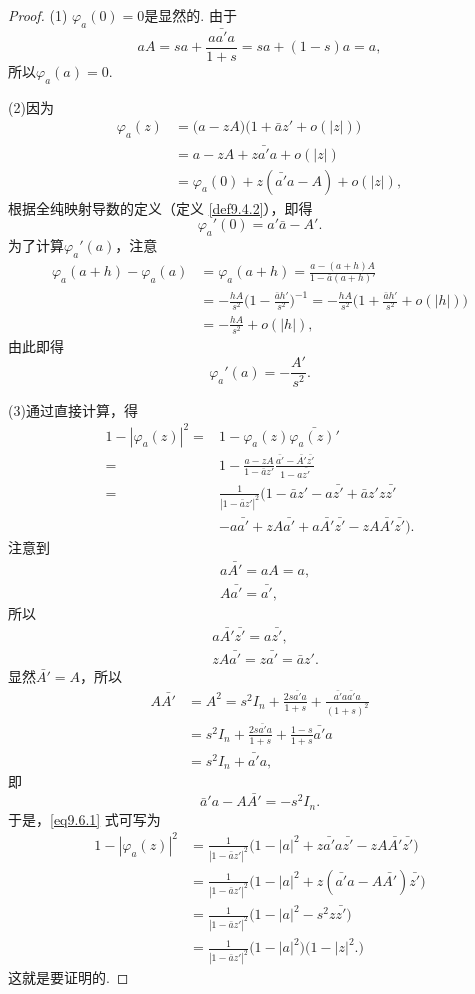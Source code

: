 \begin{proof}
(1) $\varphi_a(0)=0$是显然的. 由于
\[aA=sa+\frac{a\bar {a'}a}{1+s}=sa+(1-s)a=a,\]
所以$\varphi_a(a)=0$.

(2)因为
\begin{align*}
\varphi_a(z)&=\big(a-zA)(1+\bar az'+o(|z|)\big)\\
&=a-zA+z\bar {a'}a+o(|z|)\\
&=\varphi_a(0)+z(\bar {a'}a-A)+o(|z|),
\end{align*}
根据全纯映射导数的定义（定义 \ref{def9.4.2}），即得
\[\varphi_a'(0)=a'\bar a-A'.\]
为了计算$\varphi_a'(a)$，注意
\begin{align*}
\varphi_a(a+h)-\varphi_a(a)&=\varphi_a(a+h)=\frac{a-(a+h)A}{1-\bar a(a+h)'}\\
&=-\frac{hA}{s^2}\bigg(1-\frac{\bar ah'}{s^2}\bigg)^{-1}=
-\frac{hA}{s^2}\bigg(1+\frac{\bar ah'}{s^2}+o(|h|)\bigg)\\
&=-\frac{hA}{s^2}+o(|h|),
\end{align*}
由此即得
\[\varphi_a'(a)=-\frac{A'}{s^2}.\]

(3)通过直接计算，得
\begin{equation}\label{eq9.6.1}
\begin{aligned}
1-|\varphi_a(z)|^2={}&1-\varphi_a(z)\bar{\varphi_a(z)'}\\
={}&1-\frac{a-zA}{1-\bar az'}\frac{\bar{a'}-\bar{A'}\bar{z'}}{1-a\bar{z'}}\\
={}&\frac1{|1-\bar az'|^2}(1-\bar az'-a\bar{z'}+\bar az'z\bar{z'}\\
&-a\bar{a'}+zA\bar{a'}+a\bar{A'}\bar{z'}-zA\bar{A'}\bar{z'}).
\end{aligned}
\end{equation}
注意到
\begin{align*}
&a\bar{A'}=aA=a,\\
&A\bar{a'}=\bar{a'},
\end{align*}
所以
\begin{align*}
&a\bar{A'}\bar{z'}=a\bar{z'},\\
&zA\bar{a'}=z\bar{a'}=\bar az'.
\end{align*}
显然$\bar{A'}=A$，所以
\begin{align*}
A\bar{A'}&=A^2=s^2I_n+\frac{2s\bar{a'}a}{1+s}+\frac{\bar{a'}a\bar{a'}a}{(1+s)^2}\\
&=s^2I_n+\frac{2s\bar{a'}a}{1+s}+\frac{1-s}{1+s}\bar{a'}a\\
&=s^2I_n+\bar{a'}a,
\end{align*}
即
\[\bar a'a-A\bar{A'}=-s^2I_n.\]
于是，\eqref{eq9.6.1} 式可写为
\begin{align*}
1-|\varphi_a(z)|^2&=\frac1{|1-\bar az'|^2}\big(1-|a|^2+z\bar{a'}a\bar{z'}-
zA\bar{A'}\bar{z'}\big)\\
&=\frac1{|1-\bar az'|^2}\big(1-|a|^2+z(\bar{a'}a-A\bar{A'})\bar{z'}\big)\\
&=\frac1{|1-\bar az'|^2}\big(1-|a|^2-s^2z\bar{z'}\big)\\
&=\frac1{|1-\bar az'|^2}\big(1-|a|^2\big)\big(1-|z|^2\big.)
\end{align*}
这就是要证明的.


\end{proof}
